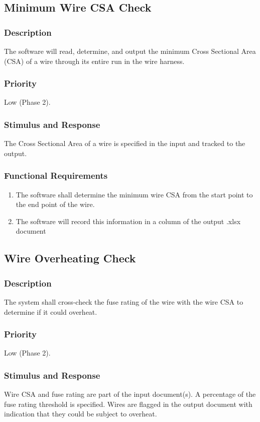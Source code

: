   \subsection{Minimum Wire CSA Check}
\subsubsection{Description}
 The software will read, determine, and output the minimum Cross Sectional Area (CSA) of a wire through its entire run in the wire harness.
\subsubsection{Priority}
Low (Phase 2).

\subsubsection{Stimulus and Response}
The Cross Sectional Area of a wire is specified in the input and tracked to the output.

\subsubsection{Functional Requirements}
\begin{enumerate}
 \item The software shall determine the minimum wire CSA from the start point to the end point of the wire.
 \item The software will record this information in a column of the output .xlsx document
\end{enumerate}





  \subsection{Wire Overheating Check}
\subsubsection{Description}
The system shall cross-check the fuse rating of the wire with the wire CSA to determine if it could overheat.

\subsubsection{Priority}
Low (Phase 2).

\subsubsection{Stimulus and Response}
Wire CSA and fuse rating are part of the input document(s). A percentage of the fuse rating threshold is specified. Wires are flagged in the output document with indication that they could be subject to overheat.

